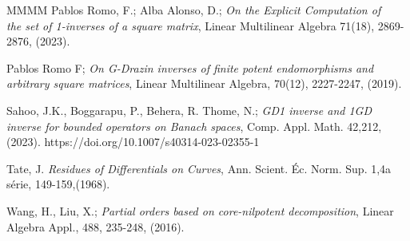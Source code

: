 \documentclass[10pt,a4paper]{amsart}
\theoremstyle{plain}
\theoremstyle{remark}
\numberwithin{equation}{section} \numberwithin{defn}{section}
\begin{document}
\begin{thebibliography}{MMMM}
 Pablos Romo, F.; Alba Alonso, D.; \textit{On the Explicit Computation of \\ the set of 1-inverses of a square matrix}, Linear Multilinear Algebra 71(18), 2869-2876, (2023).

  Pablos Romo F; \textit{On G-Drazin inverses of finite potent endomorphisms and arbitrary square matrices}, Linear Multilinear Algebra, 70(12), 2227-2247, (2019).


 Sahoo, J.K., Boggarapu, P., Behera, R. Thome, N.; \textit{GD1 inverse and 1GD inverse for bounded operators on Banach spaces}, Comp. Appl. Math. 42,212, (2023). https://doi.org/10.1007/s40314-023-02355-1

  Tate, J. \textit{Residues of Differentials on Curves}, Ann. Scient. \'Ec.
Norm. Sup. 1,4a s\'erie, 149-159,(1968).

 Wang, H., Liu, X.; \textit{Partial orders based on core-nilpotent decomposition}, Linear Algebra Appl., 488, 235-248, (2016).



\end{thebibliography}
\end{document}
